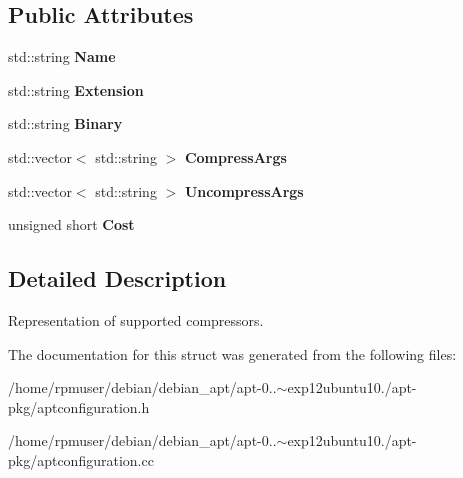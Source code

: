 \subsection*{\-Public \-Attributes}
\begin{DoxyCompactItemize}
\item 
std\-::string {\bfseries \-Name}\label{structAPT_1_1Configuration_1_1Compressor_adc852f586959ce13117d737cf3f14899}

\item 
std\-::string {\bfseries \-Extension}\label{structAPT_1_1Configuration_1_1Compressor_a0e4851f09e729e9592dce8484cc79536}

\item 
std\-::string {\bfseries \-Binary}\label{structAPT_1_1Configuration_1_1Compressor_a5f89ad96e23c260ea7a0d62890ab980b}

\item 
std\-::vector$<$ std\-::string $>$ {\bfseries \-Compress\-Args}\label{structAPT_1_1Configuration_1_1Compressor_a438d304f1749b3ad0dd6a3abbda5c50b}

\item 
std\-::vector$<$ std\-::string $>$ {\bfseries \-Uncompress\-Args}\label{structAPT_1_1Configuration_1_1Compressor_a767a69aef748a23650f5b7e12f11d586}

\item 
unsigned short {\bfseries \-Cost}\label{structAPT_1_1Configuration_1_1Compressor_a395eb05e88a9a042e1de085feeada458}

\end{DoxyCompactItemize}


\subsection{\-Detailed \-Description}
\-Representation of supported compressors. 

\-The documentation for this struct was generated from the following files\-:\begin{DoxyCompactItemize}
\item 
/home/rpmuser/debian/debian\-\_\-apt/apt-\/0..$\sim$exp12ubuntu10./apt-\/pkg/aptconfiguration.\-h\item 
/home/rpmuser/debian/debian\-\_\-apt/apt-\/0..$\sim$exp12ubuntu10./apt-\/pkg/aptconfiguration.\-cc\end{DoxyCompactItemize}
